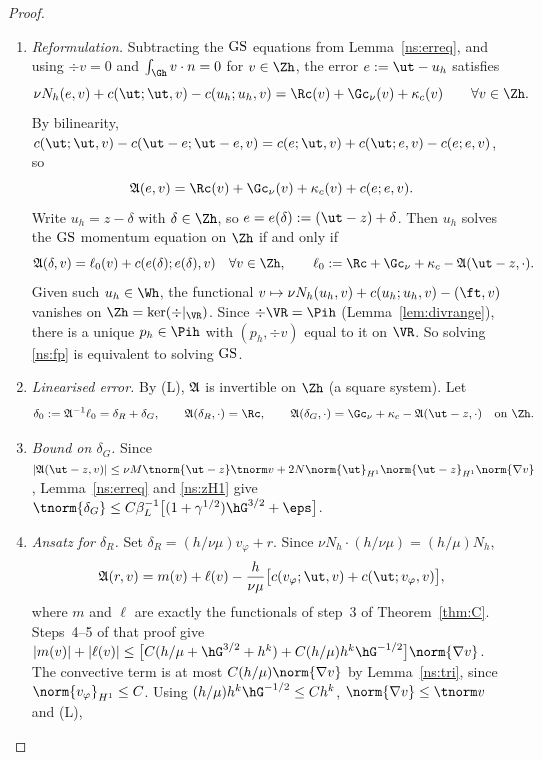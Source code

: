\begin{proof}
\begin{enumerate}
\item \emph{Reformulation.} Subtracting the $\mathrm{GS}$ equations from Lemma~\ref{ns:erreq}, and using $\div v=0$ and $\int_{\Gh}v\cdot n=0$ for $v\in\Zh$, the error $e:=\ut-u_h$ satisfies
\[
\nu N_h(e,v)+c(\ut;\ut,v)-c(u_h;u_h,v)=\Rc(v)+\Gc_\nu(v)+\kappa_c(v)\qquad\forall v\in\Zh .
\]
By bilinearity, $c(\ut;\ut,v)-c(\ut-e;\ut-e,v)=c(e;\ut,v)+c(\ut;e,v)-c(e;e,v)$, so
\[
\Aop(e,v)=\Rc(v)+\Gc_\nu(v)+\kappa_c(v)+c(e;e,v).
\]
Write $u_h=z-\delta$ with $\delta\in\Zh$, so $e=e(\delta):=(\ut-z)+\delta$. Then $u_h$ solves the $\mathrm{GS}$ momentum equation on $\Zh$ if and only if
\begin{equation}\label{ns:fp}
\Aop(\delta,v)=\ell_0(v)+c(e(\delta);e(\delta),v)\quad\forall v\in\Zh,\qquad \ell_0:=\Rc+\Gc_\nu+\kappa_c-\Aop(\ut-z,\cdot).
\end{equation}
Given such $u_h\in\Wh$, the functional $v\mapsto\nu N_h(u_h,v)+c(u_h;u_h,v)-(\ft,v)$ vanishes on $\Zh=\ker(\div|_{\VR})$. Since $\div\VR=\Pih$ (Lemma~\ref{lem:divrange}), there is a unique $p_h\in\Pih$ with $(p_h,\div v)$ equal to it on $\VR$. So solving \eqref{ns:fp} is equivalent to solving $\mathrm{GS}$.
\item \emph{Linearised error.} By (L), $\mathfrak A$ is invertible on $\Zh$ (a square system). Let
\begin{equation}\label{ns:delta0}
\delta_0:=\Aop^{-1}\ell_0=\delta_R+\delta_G,\qquad \Aop(\delta_R,\cdot)=\Rc,\qquad \Aop(\delta_G,\cdot)=\Gc_\nu+\kappa_c-\Aop(\ut-z,\cdot)\quad\text{on }\Zh .
\end{equation}
\item \emph{Bound on $\delta_G$.} Since $|\Aop(\ut-z,v)|\le\nu M\tnorm{\ut-z}\tnorm v+2N\norm{\ut}_{H^1}\norm{\ut-z}_{H^1}\norm{\nabla v}$, Lemma~\ref{ns:erreq} and \eqref{ns:zH1} give $\tnorm{\delta_G}\le C\beta_L^{-1}\bigl[(1+\gamma^{1/2})\hG^{3/2}+\eps\bigr]$.
\item \emph{Ansatz for $\delta_R$.} Set $\delta_R=(h/\nu\mu)v_\varphi+r$. Since $\nu N_h\cdot(h/\nu\mu)=(h/\mu)N_h$,
\[
\Aop(r,v)=m(v)+\ell(v)-\frac{h}{\nu\mu}\bigl[c(v_\varphi;\ut,v)+c(\ut;v_\varphi,v)\bigr],
\]
where $m$ and $\ell$ are exactly the functionals of step~3 of Theorem~\ref{thm:C}. Steps~4--5 of that proof give $|m(v)|+|\ell(v)|\le\bigl[C(h/\mu+\hG^{3/2}+h^k)+C(h/\mu)h^k\hG^{-1/2}\bigr]\norm{\nabla v}$. The convective term is at most $C(h/\mu)\norm{\nabla v}$ by Lemma~\ref{ns:tri}, since $\norm{v_\varphi}_{H^1}\le C$. Using $(h/\mu)h^k\hG^{-1/2}\le Ch^k$, $\norm{\nabla v}\le\tnorm v$ and (L),

\end{enumerate}
\end{proof}
